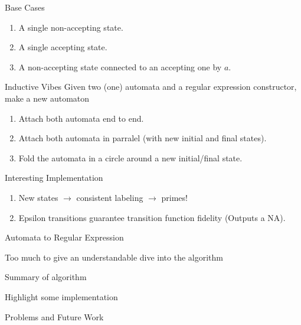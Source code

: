 \documentclass{beamer}
\begin{document}
\begin{frame}{Base Cases}
	\large
	\begin{enumerate}[]\item {} A single non-accepting state.
		\item {} A single accepting state. 
		\item {} A non-accepting state connected to an accepting one by $a$.
	\end{enumerate}
\end{frame}

\begin{frame}{Inductive Vibes}
	\large
	Given two (one) automata and a regular expression constructor, make a new automaton
	\begin{enumerate}[]
		\item {} Attach both automata end to end.
		\item {} Attach both automata in parralel (with new initial and final states).
		\item {} Fold the automata in a circle around a new initial/final state.
	\end{enumerate}
\end{frame}

\begin{frame}{Interesting Implementation}
	\large
	\begin{enumerate}[]
		\item New states $\rightarrow$ consistent labeling $\rightarrow$ primes!
		\item Epsilon transitions guarantee transition function fidelity (Outputs a NA). 
		
	\end{enumerate}
\end{frame}

\begin{frame}{Automata to Regular Expression}
	\centering \Large
	
	Too much to give an understandable dive into the algorithm
	
	\vspace{5mm}
	
	Summary of algorithm
	
	\vspace{5mm}
	
	Highlight some implementation
	
	\vspace{5mm}
	
	Problems and Future Work
\end{frame}
\end{document}
